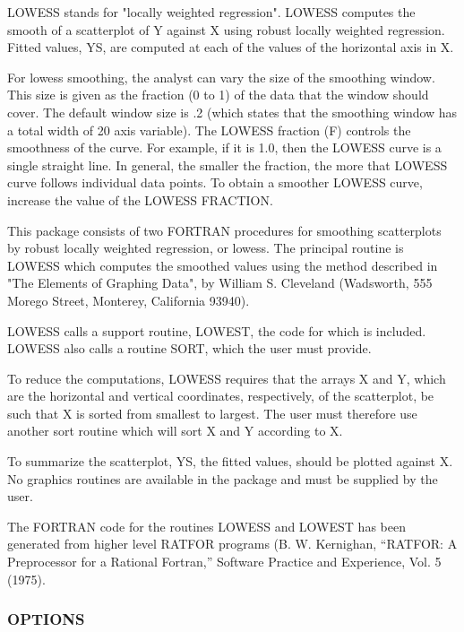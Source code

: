 \begin{DoxyVerb}LOWESS stands for "locally weighted regression". LOWESS computes the
smooth of a scatterplot of Y against X using robust locally weighted
regression. Fitted values, YS, are computed at each of the values of
the horizontal axis in X.

For lowess smoothing, the analyst can vary the size of the smoothing
window.  This size is given as the fraction (0 to 1) of the data that
the window should cover. The default window size is .2 (which states
that the smoothing window has a total width of 20%
axis variable). The LOWESS fraction (F) controls the smoothness of the
curve. For example, if it is 1.0, then the LOWESS curve is a single
straight line. In general, the smaller the fraction, the more that
LOWESS curve follows individual data points. To obtain a smoother
LOWESS curve, increase the value of the LOWESS FRACTION.

This package consists of two FORTRAN procedures for smoothing
scatterplots by robust locally weighted regression, or lowess. The
principal routine is LOWESS which computes the smoothed values using
the method described in "The Elements of Graphing Data", by William S.
Cleveland (Wadsworth, 555 Morego Street, Monterey, California 93940).

LOWESS calls a support routine, LOWEST, the code for which is
included. LOWESS also calls a routine SORT, which the user must provide.

To reduce the computations, LOWESS requires that the arrays X and Y,
which are the horizontal and vertical coordinates, respectively, of the
scatterplot, be such that X is sorted from smallest to largest. The
user must therefore use another sort routine which will sort X and Y
according to X.

To summarize the scatterplot, YS, the fitted values, should be plotted
against X. No graphics routines are available in the package and must
be supplied by the user.

The FORTRAN code for the routines LOWESS and LOWEST has been generated
from higher level RATFOR programs (B. W. Kernighan, ``RATFOR: A
Preprocessor for a Rational Fortran,'' Software Practice and Experience,
Vol. 5 (1975).
\end{DoxyVerb}


\subsubsection*{O\+P\+T\+I\+O\+NS}

